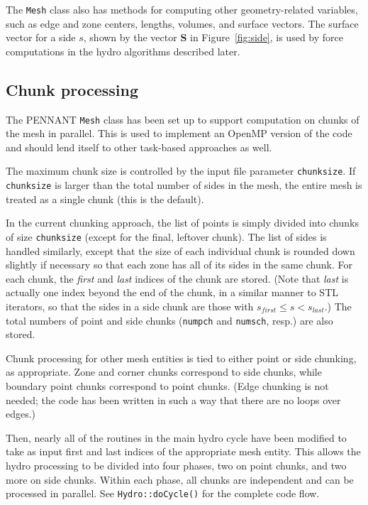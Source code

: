 \documentclass[11pt,letterpaper]{article} %
\begin{document}
The {\tt Mesh} class also has methods for computing other
geometry-related variables, such as edge and zone centers, lengths,
volumes, and surface vectors.  The surface vector for a side $s$, shown
by the vector {\bf S} in Figure~\ref{fig:side}, is used by force
computations in the hydro algorithms described later.

\subsection{Chunk processing}

The PENNANT {\tt Mesh} class has been set up to support computation
on chunks of the mesh in parallel.  This is used to implement an OpenMP
version of the code and should lend itself to other task-based approaches
as well.

The maximum chunk size is controlled by the input file parameter
{\tt chunksize}.  If {\tt chunksize} is larger than the total number of
sides in the mesh, the entire mesh is treated as a single chunk
(this is the default).

In the current chunking approach, the list of points is simply divided
into chunks of size {\tt chunksize} (except for the final, leftover chunk).
The list of sides is handled similarly, except that
the size of each individual chunk is rounded down slightly if necessary
so that each zone has all of its sides in the same chunk.  For each chunk,
the {\em first} and {\em last} indices of the chunk are stored.
(Note that {\em last} is actually one index beyond the end of the chunk,
in a similar manner to STL iterators, so that the sides in a side chunk
are those with $s_{first} \le s < s_{last}$.)  The total numbers of point
and side chunks ({\tt numpch} and {\tt numsch}, resp.) are also stored.

Chunk processing for other mesh entities is tied to either point or
side chunking, as appropriate.  Zone and corner chunks correspond to
side chunks, while boundary point chunks correspond to point chunks.
(Edge chunking is not needed; the code has been written in such a way
that there are no loops over edges.)

Then, nearly all of the routines in the main hydro cycle have been
modified to take as input first and last indices of the appropriate
mesh entity.  This allows the hydro processing to be divided into
four phases, two on point chunks, and two more on side chunks.
Within each phase, all chunks are independent and can be processed
in parallel.
See {\tt Hydro::doCycle()} for the complete code flow.
\end{document}
